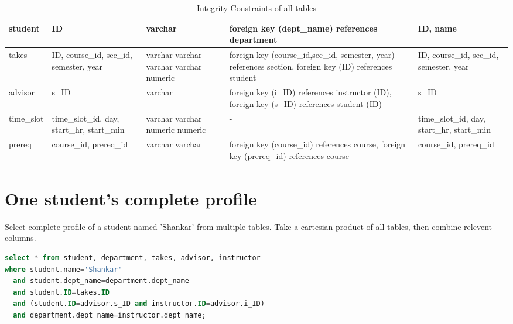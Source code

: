 \documentclass{article}
\begin{document}
\clearpage

    \begin{table}[ht]
\begin{tabular}{||p{2cm}||p{2cm}||p{2cm}||p{3cm}||p{2cm}||}
\hline \hline
 
student & ID & varchar & foreign key (dept\_name) references department & ID, name \\ \hline \hline

takes & ID, course\_id, sec\_id, semester, year & varchar \newline varchar \newline varchar \newline varchar \newline numeric & foreign key (course\_id,sec\_id, semester, year) references section,
	 foreign key (ID) references student & ID, course\_id, sec\_id, semester, year \\ \hline \hline

advisor & s\_ID  & varchar & foreign key (i\_ID) references instructor (ID), foreign key (s\_ID) references student (ID) & s\_ID \\ \hline \hline

time\_slot & time\_slot\_id, day, start\_hr, start\_min & varchar \newline varchar \newline numeric \newline numeric & - & time\_slot\_id, day, start\_hr, start\_min \\ \hline \hline
	 
prereq & course\_id, prereq\_id & varchar \newline varchar & foreign key (course\_id) references course,
	 foreign key (prereq\_id) references course & course\_id, prereq\_id\\ \hline \hline
	 

\end{tabular}
\caption{Integrity Constraints of all tables}
\end{table}

\newpage
\section{One student's complete profile}
Select complete profile of a student named 'Shankar' from multiple tables.
Take a cartesian product of all tables, then combine relevent columns.
\begin{lstlisting}[language=sql]
select * from student, department, takes, advisor, instructor
where student.name='Shankar' 
  and student.dept_name=department.dept_name 
  and student.ID=takes.ID 
  and (student.ID=advisor.s_ID and instructor.ID=advisor.i_ID) 
  and department.dept_name=instructor.dept_name;
\end{lstlisting}
\end{document}

